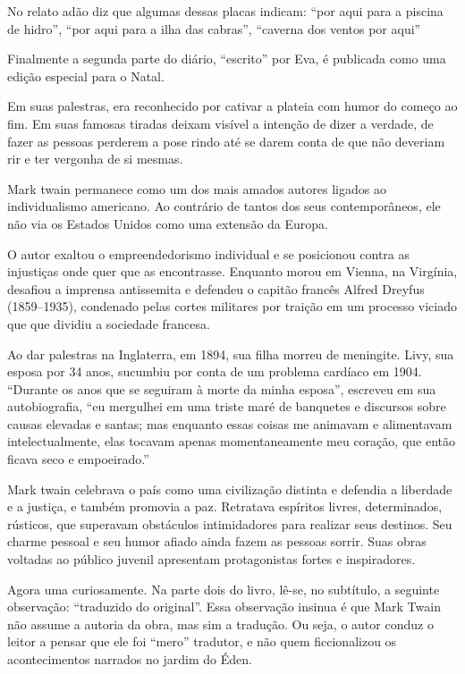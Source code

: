 \documentclass[12pt]{extarticle}
\begin{document}
No relato adão diz que algumas dessas placas indicam: “por aqui para 
a piscina de hidro”, “por aqui para a ilha das cabras”, “caverna dos ventos por aqui”

Finalmente a segunda parte do diário, “escrito” por Eva, 
é publicada como uma edição especial para o Natal.

Em suas palestras, era reconhecido por cativar a plateia com humor do começo ao fim. 
Em suas famosas tiradas deixam visível a intenção de dizer a verdade, 
de fazer as pessoas perderem a pose rindo até se darem conta de que não
deveriam rir e ter vergonha de si mesmas.

Mark twain permanece como um dos mais amados autores ligados ao individualismo 
americano. Ao contrário de tantos dos seus contemporâneos, ele não via os Estados Unidos 
como uma extensão da Europa. 

O autor exaltou o empreendedorismo individual e se posicionou contra as 
injustiças onde quer que as encontrasse. Enquanto morou em Vienna, na Virgínia, 
desafiou a imprensa antissemita e defendeu o capitão francês Alfred Dreyfus (1859--1935), 
condenado pelas cortes militares por traição em um processo viciado que 
que dividiu a sociedade francesa.

Ao dar palestras na Inglaterra, em 1894, sua filha morreu de meningite. 
Livy, sua esposa por 34 anos, sucumbiu por conta de um problema cardíaco em 1904. 
“Durante os anos que se seguiram à morte da minha esposa”, escreveu em sua autobiografia, 
“eu mergulhei em uma triste maré de banquetes e discursos sobre causas elevadas e santas; 
mas enquanto essas coisas me animavam e alimentavam intelectualmente, 
elas tocavam apenas momentaneamente meu coração, que então ficava seco e empoeirado.”

Mark twain celebrava o país como uma civilização distinta e defendia a liberdade e a justiça, 
e também promovia a paz. 
Retratava espíritos livres, determinados, rústicos, que superavam obstáculos intimidadores para realizar seus destinos. Seu charme pessoal e seu humor afiado ainda fazem as pessoas sorrir. 
Suas obras voltadas ao público juvenil apresentam protagonistas fortes e inspiradores.


Agora uma curiosamente. Na parte dois
do livro, lê-se, no subtítulo, a seguinte observação: “traduzido do original”.
Essa observação insinua é que Mark Twain não assume a autoria da obra, 
mas sim a tradução.
Ou seja, o autor conduz o leitor a pensar que ele foi “mero” tradutor, 
e não quem ficcionalizou os acontecimentos narrados no jardim do Éden.
\end{document}
